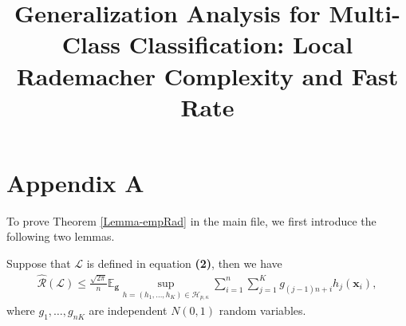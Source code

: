 \documentclass[10pt]{llncs}
\begin{document}
\mainmatter  %







\title{Generalization Analysis for Multi-Class Classification: Local Rademacher Complexity and Fast Rate}
\author{}
\institute{}

\maketitle
\section{Appendix A}
To prove Theorem \ref{Lemma-empRad} in the main file, we first introduce the following two lemmas.
\begin{lemma}
\label{hatRLlemma}
Suppose that $\mathcal{L}$ is defined in equation \textbf{(2)},
then we have
\begin{align*}
  \hat{\mathcal{R}}(\mathcal{L})\leq\frac{\sqrt{2\pi}}{n}\mathbb{E}_{\mathbf g}\sup_{h=(h_1,\ldots,h_K)
  \in\mathcal{H}_{p,\kappa}}\sum_{i=1}^n\sum_{j=1}^Kg_{(j-1)n+i}h_j(\mathbf x_i),
\end{align*}
 where $g_1,\ldots,g_{nK}$ are  independent $N(0,1)$ random variables.
\end{lemma}
\end{document}
